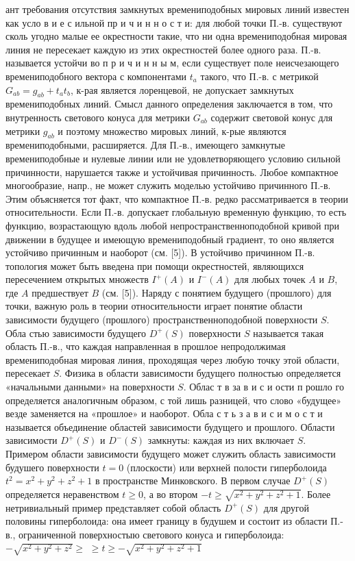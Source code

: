 \documentclass[10pt]{article}
\begin{document}
ант требования отсутствия замкнутых времениподобных мировых линий известен как усло в и е с ильной пр и ч и н н о с т и: для любой точки П.-в. существуют сколь угодно малые ее окрестности такие, что ни одна времениподобная мировая линия не пересекает каждую из этих окрестностей более одного раза. П.-в. называется устойчи во п р и ч и н н ы м, если существует поле неисчезающего времениподобного вектора с компонентами $t_{a}$ такого, что П.-в. с метрикой $G_{a b}=g_{a b}+t_{a} t_{b}$, к-рая является лоренцевой, не допускает замкнутых времениподобных линий. Смысл данного определения заключается в том, что внутренность светового конуса для метрики $G_{a b}$ содержит световой конус для метрики $g_{a b}$ и поэтому множество мировых линий, к-рые являются времениподобными, расширяется. Для П.-в., имеющего замкнутые времениподобные и нулевые линии или не удовлетворяющего условию сильной причинности, нарушается также и устойчивая причинность. Любое компактное многообразие, напр., не может служить моделью устойчиво причинного П.-в. Этим объясняется тот факт, что компактное П.-в. редко рассматривается в теории относительности. Если П.-в. допускает глобальную временную функцию, то есть функцию, возрастающую вдоль любой непространственноподобной кривой при движении в будущее и имеющую времениподобный градиент, то оно является устойчиво причинным и наоборот (см. [5]). В устойчиво причинном П.-в. топология может быть введена при помощи окрестностей, являющихся пересечением открытых множеств $I^{+}(A)$ и $I^{-}(A)$ для любых точек $A$ и $B$, где $A$ предшествует $B$ (см. [5]). Наряду с понятием будущего (прошлого) для точки, важную роль в теории относительности играет понятие области зависимости будущего (прошлого) пространственноподобной поверхности $S$. Обла стью зависимости будущего $D^{+}(S)$ поверхности $S$ называется такая область П.-в., что каждая направленная в прошлое непродолжимая времениподобная мировая линия, проходящая через любую точку этой области, пересекает $S$. Физика в области зависимости будущего полностью определяется «начальными данными» на поверхности $S$. Облас т в за в и с и ости п рошло го определяется аналогичным образом, с той лишь разницей, что слово «будущее» везде заменяется на «прошлое» и наоборот. Обла с т ь з а в и с и м о с т и называется объединение областей зависимости будущего и прошлого. Области зависимости $D^{+}(S)$ и $D^{-}(S)$ замкнуты: каждая из них включает $S$. Примером области зависимости будущего может служить область зависимости будушего поверхности $t=0$ (плоскости) или верхней полости гиперболоида $t^{2}=x^{2}+y^{2}+z^{2}+1$ в пространстве Минковского. В первом случае $D^{+}(S)$ определяется неравенством $t \geqslant 0$, а во втором $-t \geqslant \sqrt{x^{2}+y^{2}+z^{2}+1}$. Более нетривиальный пример представляет собой область $D^{+}(S)$ для другой половины гиперболоида: она имеет границу в будушем и состоит из области П.-в., ограниченной поверхностыю светового конуса и гиперболоида: $-\sqrt{x^{2}+y^{2}+z^{2}} \geqslant$ $\geqslant t \geqslant-\sqrt{x^{2}+y^{2}+z^{2}+1}$
\end{document}
